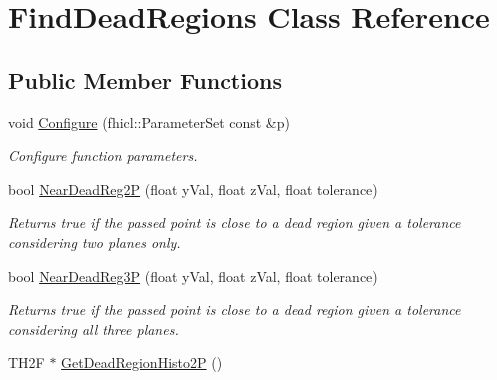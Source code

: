 \hypertarget{classFindDeadRegions}{\section{Find\-Dead\-Regions Class Reference}
\label{classFindDeadRegions}
}
\subsection*{Public Member Functions}
\begin{DoxyCompactItemize}
\item 
\hypertarget{classFindDeadRegions_a94b207b673c58df861537ead4ec5385a}{void \hyperlink{classFindDeadRegions_a94b207b673c58df861537ead4ec5385a}{Configure} (fhicl\-::\-Parameter\-Set const \&p)}\label{classFindDeadRegions_a94b207b673c58df861537ead4ec5385a}

\begin{DoxyCompactList}\small\item\em Configure function parameters. \end{DoxyCompactList}\item 
\hypertarget{classFindDeadRegions_a7a884dc4685e66734b98afea9a2c6c21}{bool \hyperlink{classFindDeadRegions_a7a884dc4685e66734b98afea9a2c6c21}{Near\-Dead\-Reg2\-P} (float y\-Val, float z\-Val, float tolerance)}\label{classFindDeadRegions_a7a884dc4685e66734b98afea9a2c6c21}

\begin{DoxyCompactList}\small\item\em Returns true if the passed point is close to a dead region given a tolerance considering two planes only. \end{DoxyCompactList}\item 
\hypertarget{classFindDeadRegions_a2ef76eca81785361bf95c17e8e1a7574}{bool \hyperlink{classFindDeadRegions_a2ef76eca81785361bf95c17e8e1a7574}{Near\-Dead\-Reg3\-P} (float y\-Val, float z\-Val, float tolerance)}\label{classFindDeadRegions_a2ef76eca81785361bf95c17e8e1a7574}

\begin{DoxyCompactList}\small\item\em Returns true if the passed point is close to a dead region given a tolerance considering all three planes. \end{DoxyCompactList}\item 
\hypertarget{classFindDeadRegions_a712767abce6132b0dd6638a335da87fa}{T\-H2\-F $\ast$ \hyperlink{classFindDeadRegions_a712767abce6132b0dd6638a335da87fa}{Get\-Dead\-Region\-Histo2\-P} ()}\label{classFindDeadRegions_a712767abce6132b0dd6638a335da87fa}


\end{DoxyCompactItemize}
